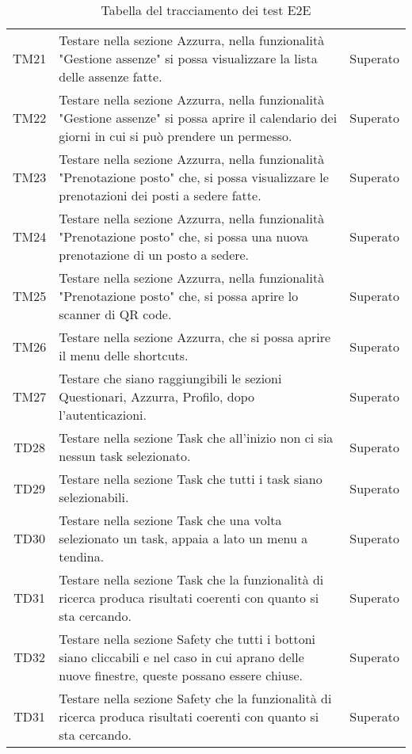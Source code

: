 \begin{table}[h]%
	\renewcommand{\arraystretch}{1.6}
	\centering
	\begin{tabularx}{\textwidth}{c X c}
		\hline	
		\rowcolor{heavenly}
		\intest{Codice} &  \intest{Descrizione} & \intest{Esito}\\	
		\hline	
		TM21 & Testare nella sezione Azzurra, nella funzionalità "Gestione assenze" si possa visualizzare la lista delle assenze fatte. & Superato\\
		TM22 & Testare nella sezione Azzurra, nella funzionalità "Gestione assenze" si possa aprire il calendario dei giorni in cui si può prendere un permesso. & Superato\\
		TM23 & Testare nella sezione Azzurra, nella funzionalità "Prenotazione posto" che, si possa visualizzare le prenotazioni dei posti a sedere fatte. & Superato\\
		TM24 & Testare nella sezione Azzurra, nella funzionalità "Prenotazione posto" che, si possa una nuova prenotazione di un posto a sedere. & Superato\\
		TM25 & Testare nella sezione Azzurra, nella funzionalità "Prenotazione posto" che, si possa aprire lo scanner di \gls{QR code}\ap{[g]}. & Superato\\
		TM26 & Testare nella sezione Azzurra, che si possa aprire il menu delle shortcuts. & Superato\\
		TM27 & Testare che siano raggiungibili le sezioni Questionari, Azzurra, Profilo, dopo l'autenticazioni. & Superato \\
		TD28 & Testare nella sezione Task che all'inizio non ci sia nessun task selezionato. & Superato \\
		TD29 & Testare nella sezione Task che tutti i task siano selezionabili. & Superato \\
		TD30 & Testare nella sezione Task che una volta selezionato un task, appaia a lato un menu a tendina. & Superato \\
		TD31 & Testare nella sezione Task che la funzionalità di ricerca produca risultati coerenti con quanto si sta cercando. & Superato \\
		TD32 & Testare nella sezione Safety che tutti i bottoni siano cliccabili e nel caso in cui aprano delle nuove finestre, queste possano essere chiuse. & Superato \\
		TD31 & Testare nella sezione Safety che la funzionalità di ricerca produca risultati coerenti con quanto si sta cercando. & Superato \\
		\hline
	\end{tabularx} \hbox{}
	\caption{Tabella del tracciamento dei test E2E}
\end{table}%
